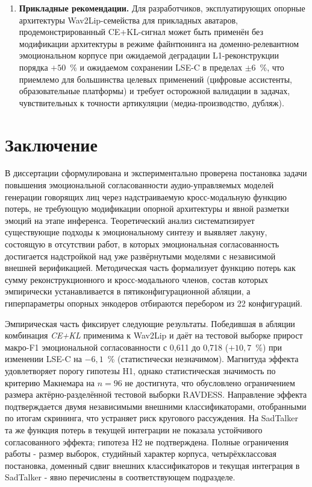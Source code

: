 \documentclass[a4paper, 12pt, oneside, openany]{article}
\begin{document}
\begin{enumerate}
\item \textbf{Прикладные рекомендации.} Для разработчиков, эксплуатирующих опорные архитектуры Wav2Lip-семейства для прикладных аватаров, продемонстрированный CE+KL-сигнал может быть применён без модификации архитектуры в режиме файнтюнинга на доменно-релевантном эмоциональном корпусе при ожидаемой деградации L1-реконструкции порядка $+50$~\% и ожидаемом сохранении LSE-C в пределах $\pm 6$~\%, что приемлемо для большинства целевых применений (цифровые ассистенты, образовательные платформы) и требует осторожной валидации в задачах, чувствительных к точности артикуляции (медиа-производство, дубляж).
\end{enumerate}

\section{Заключение}

В диссертации сформулирована и экспериментально проверена постановка задачи повышения эмоциональной согласованности аудио-управляемых моделей генерации говорящих лиц через надстраиваемую кросс-модальную функцию потерь, не требующую модификации опорной архитектуры и явной разметки эмоций на этапе инференса. Теоретический анализ систематизирует существующие подходы к эмоциональному синтезу и выявляет лакуну, состоящую в отсутствии работ, в которых эмоциональная согласованность достигается надстройкой над уже развёрнутыми моделями с независимой внешней верификацией. Методическая часть формализует функцию потерь как сумму реконструкционного и кросс-модального членов, состав которых эмпирически устанавливается в пятиконфигурационной абляции, а гиперпараметры опорных энкодеров отбираются перебором из 22 конфигураций.

Эмпирическая часть фиксирует следующие результаты. Победившая в абляции комбинация \textit{CE+KL} применима к Wav2Lip и даёт на тестовой выборке прирост макро-F1 эмоциональной согласованности с 0,611 до 0,718 ($+10{,}7$~\%) при изменении LSE-C на $-6{,}1$~\% (статистически незначимом). Магнитуда эффекта удовлетворяет порогу гипотезы H1, однако статистическая значимость по критерию Макнемара на $n=96$ не достигнута, что обусловлено ограничением размера актёрно-разделённой тестовой выборки RAVDESS. Направление эффекта подтверждается двумя независимыми внешними классификаторами, отобранными по итогам скрининга, что устраняет риск кругового рассуждения. На SadTalker та же функция потерь в текущей интеграции не показала устойчивого согласованного эффекта; гипотеза H2 не подтверждена. Полные ограничения работы - размер выборок, студийный характер корпуса, четырёхклассовая постановка, доменный сдвиг внешних классификаторов и текущая интеграция в SadTalker - явно перечислены в соответствующем подразделе.
\end{document}
